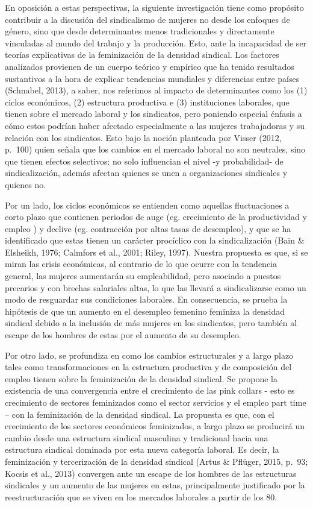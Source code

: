 \documentclass[
]{book}
\begin{document}
En oposición a estas perspectivas, la siguiente investigación tiene como propósito contribuir a la discusión del sindicalismo de mujeres no desde los enfoques de género, sino que desde determinantes menos tradicionales y directamente vinculadas al mundo del trabajo y la producción. Esto, ante la incapacidad de ser teorías explicativas de la feminización de la densidad sindical. Los factores analizados provienen de un cuerpo teórico y empírico que ha tenido resultados sustantivos a la hora de explicar tendencias mundiales y diferencias entre países (Schnabel, 2013), a saber, nos referimos al impacto de determinantes como los (1) ciclos económicos, (2) estructura productiva e (3) instituciones laborales, que tienen sobre el mercado laboral y los sindicatos, pero poniendo especial énfasis a cómo estos podrían haber afectado especialmente a las mujeres trabajadoras y su relación con los sindicatos. Esto bajo la noción planteada por Visser (2012, p.~100) quien señala que los cambios en el mercado laboral no son neutrales, sino que tienen efectos selectivos: no solo influencian el nivel -y probabilidad- de sindicalización, además afectan quienes se unen a organizaciones sindicales y quienes no.

Por un lado, los ciclos económicos se entienden como aquellas fluctuaciones a corto plazo que contienen periodos de auge (eg. crecimiento de la productividad y empleo ) y declive (eg. contracción por altas tasas de desempleo), y que se ha identificado que estas tienen un carácter procíclico con la sindicalización (Bain \& Elsheikh, 1976; Calmfors et al., 2001; Riley, 1997). Nuestra propuesta es que, si se miran las crisis económicas, al contrario de lo que ocurre con la tendencia general, las mujeres aumentarán su empleabilidad, pero asociado a puestos precarios y con brechas salariales altas, lo que las llevará a sindicalizarse como un modo de resguardar sus condiciones laborales. En consecuencia, se prueba la hipótesis de que un aumento en el desempleo femenino feminiza la densidad sindical debido a la inclusión de más mujeres en los sindicatos, pero también al escape de los hombres de estas por el aumento de su desempleo.

Por otro lado, se profundiza en como los cambios estructurales y a largo plazo tales como transformaciones en la estructura productiva y de composición del empleo tienen sobre la feminización de la densidad sindical. Se propone la existencia de una convergencia entre el crecimiento de las pink collars - esto es crecimiento de sectores feminizados como el sector servicios y el empleo part time -- con la feminización de la densidad sindical. La propuesta es que, con el crecimiento de los sectores económicos feminizados, a largo plazo se producirá un cambio desde una estructura sindical masculina y tradicional hacia una estructura sindical dominada por esta nueva categoría laboral. Es decir, la feminización y tercerización de la densidad sindical (Artus \& Pflüger, 2015, p.~93; Kocsis et al., 2013) convergen ante un escape de los hombres de las estructuras sindicales y un aumento de las mujeres en estas, principalmente justificado por la reestructuración que se viven en los mercados laborales a partir de los 80.
\end{document}
